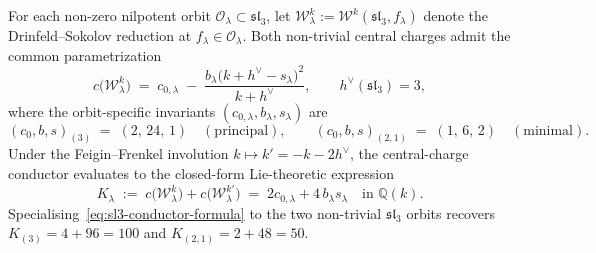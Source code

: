 \begin{proposition}
\label{prop:sl3-conductor-shift-formula}
For each non-zero nilpotent orbit
$\mathcal{O}_\lambda \subset \mathfrak{sl}_3$, let
$\mathcal{W}^k_\lambda := \mathcal{W}^k(\mathfrak{sl}_3, f_\lambda)$
denote the Drinfeld--Sokolov reduction at $f_\lambda \in \mathcal{O}_\lambda$.
Both non-trivial central charges admit the common parametrization
\begin{equation}\label{eq:sl3-conductor-c-shifted}
c\bigl(\mathcal{W}^k_\lambda\bigr)
\;=\;
c_{0,\lambda} \;-\; \frac{b_\lambda\bigl(k + h^\vee - s_\lambda\bigr)^2}{k + h^\vee},
\qquad h^\vee(\mathfrak{sl}_3) = 3,
\end{equation}
where the orbit-specific invariants
$(c_{0,\lambda}, b_\lambda, s_\lambda)$ are
\begin{equation}\label{eq:sl3-shift-table}
(c_{0}, b, s)_{(3)} \;=\; (2,\, 24,\, 1)\quad(\text{principal}),
\qquad
(c_{0}, b, s)_{(2,1)} \;=\; (1,\, 6,\, 2)\quad(\text{minimal}).
\end{equation}
Under the Feigin--Frenkel involution $k \mapsto k' = -k - 2h^\vee$,
the central-charge conductor evaluates to the closed-form Lie-theoretic
expression
\begin{equation}\label{eq:sl3-conductor-formula}
K_\lambda \;:=\; c\bigl(\mathcal{W}^k_\lambda\bigr)
+ c\bigl(\mathcal{W}^{k'}_\lambda\bigr)
\;=\; 2c_{0,\lambda} + 4\, b_\lambda s_\lambda
\quad \text{in } \mathbb{Q}(k).
\end{equation}
Specialising~\eqref{eq:sl3-conductor-formula} to the two non-trivial
$\mathfrak{sl}_3$ orbits recovers
$K_{(3)} = 4 + 96 = 100$ and $K_{(2,1)} = 2 + 48 = 50$.
\end{proposition}

